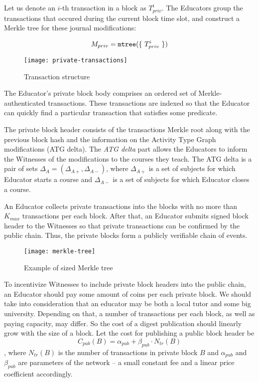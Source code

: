 Let us denote an $i$-th transaction in a block as $T_{priv}^i$. The Educators
group the transactions that occured during the current block time slot, and
construct a Merkle tree \cite{merkle1989certified} for these journal
modifications:

\begin{equation}
M_{priv} = \MerkleTree(\{\ T_{priv}^i\ \})
\end{equation}

\begin{figure}[ht]
\centering
\texttt{[image: private-transactions]}
\caption{Transaction structure}
\label{fig:private-transactions}
\end{figure}

The Educator's private block body comprises an ordered set of
Merkle-authenticated transactions. These transactions are indexed so that the
Educator can quickly find a particular transaction that satisfies some
predicate.

The private block header consists of the transactions Merkle root along with the
previous block hash and the information on the Activity Type Graph modifications
(ATG delta). The \textit{ATG delta} part allows the Educators to inform the
Witnesses of the modifications to the courses they teach. The ATG delta is a
pair of sets $\Delta_A = (\Delta_{A+}, \Delta_{A-})$, where $\Delta_{A+}$ is a
set of subjects for which Educator starts a course and $\Delta_{A-}$ is a set of
subjects for which Educator closes a course.

An Educator collects private transactions into the blocks with no more than $K_{max}$
transactions per each block. After that, an Educator submits signed block header
to the Witnesses so that private transactions can be confirmed by the public
chain. Thus, the private blocks form a publicly verifiable chain of events.

\begin{figure}[ht]
\centering
\texttt{[image: merkle-tree]}
\caption{Example of sized Merkle tree}
\label{fig:merkle-tree}
\end{figure}

To incentivize Witnesses to include private block headers into the public chain,
an Educator should pay some amount of coins per each private block. We should
take into consideration that an educator may be both a local tutor and some big
university. Depending on that, a number of transactions per each block, as well
as paying capacity, may differ. So the cost of a digest publication should
linearly grow with the size of a block. Let the cost for publishing a
public block header be
\begin{equation}\label{sec:priv-chain:pub-cost-eq}
  C_{pub}(B) = \alpha_{pub} + \beta_{pub} \cdot N_{tr}(B)
\end{equation}
, where $N_{tr}(B)$ is the number of transactions in private block $B$ and
$\alpha_{pub}$ and $\beta_{pub}$ are parameters of the network -- a small
constant fee and a linear price coefficient accordingly.

